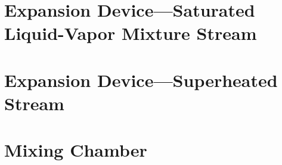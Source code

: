 \section{Expansion Device---Saturated Liquid-Vapor Mixture Stream} \label{sec:ExpandMain}

\section{Expansion Device---Superheated Stream} \label{sec:ExpandSHV}

\section{Mixing Chamber} \label{sec:Mixing}

